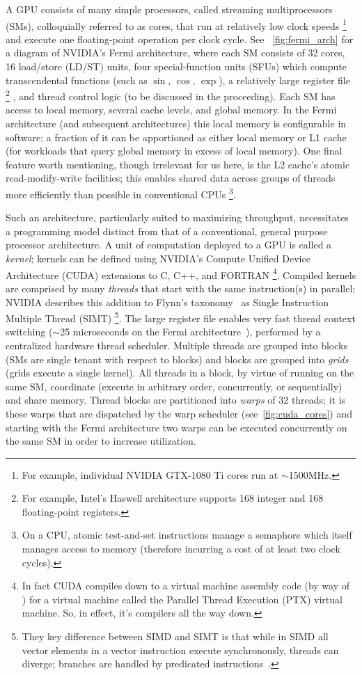 \documentclass[sigconf]{acmart}
\begin{document}
A GPU consists of many simple processors, called streaming multiprocessors (SMs), colloquially referred to as cores, that run at relatively low clock speeds%
\footnote{For example, individual NVIDIA GTX-1080 Ti cores run at $\sim$1500MHz.}
and execute one floating-point operation per clock cycle.
See ~\cref{fig:fermi_arch} for a diagram of NVIDIA's Fermi architecture, where each SM consists of 32 cores, 16 load/store (LD/ST) units, four special-function units (SFUs) which compute transcendental functions (such as $\sin$, $\cos$, $\exp$), a relatively large register file%
\footnote{For example, Intel's Haswell architecture supports 168 integer and 168 floating-point registers.}%
, and thread control logic (to be discussed in the proceeding).
Each SM has access to local memory, several cache levels, and global memory.
In the Fermi architecture (and subsequent architectures) this local memory is configurable in software;
a fraction of it can be apportioned as either local memory or L1 cache (for workloads that query global memory in excess of local memory).
One final feature worth mentioning, though irrelevant for us here, is the L2 cache's atomic read-modify-write facilities;
this enables shared data across groups of threads more efficiently than possible in conventional CPUs%
\footnote{On a CPU, atomic test-and-set instructions manage a semaphore which itself manages access to memory (therefore incurring a cost of at least two clock cycles).}.

Such an architecture, particularly suited to maximizing throughput, necessitates a programming model distinct from that of a conventional, general purpose processor architecture.
A unit of computation deployed to a GPU is called a \textit{kernel}; kernels can be defined using NVIDIA's Compute Unified Device Architecture (CUDA) extensions to C, C++, and FORTRAN%
\footnote{In fact CUDA compiles down to a virtual machine assembly code (by way of ) for a virtual machine called the Parallel Thread Execution (PTX) virtual machine. So, in effect, it's compilers all the way down.}.
Compiled kernels are comprised by many \textit{threads} that start with the same instruction(s) in parallel;
NVIDIA describes this addition to Flynn's taxonomy~\cite{5009071} as Single Instruction Multiple Thread (SIMT)%
\footnote{They key difference between SIMD and SIMT is that while in SIMD all vector elements in a vector instruction execute synchronously, threads can diverge; branches are handled by predicated instructions~\cite{cuda_toolkit}.}.
The large register file enables very fast thread context switching ($\sim$25 microseconds on the Fermi architecture~\cite{Glaskowsky2009NVIDIAS}), performed by a centralized hardware thread scheduler.
Multiple threads are grouped into blocks (SMs are single tenant with respect to blocks) and blocks are grouped into \textit{grids} (grids execute a single kernel).
All threads in a block, by virtue of running on the same SM, coordinate (execute in arbitrary order, concurrently, or sequentially) and share memory.
Thread blocks are partitioned into \textit{warps} of 32 threads;
it is these warps that are dispatched by the warp scheduler (see~\cref{fig:cuda_cores}) and starting with the Fermi architecture two warps can be executed concurrently on the same SM in order to increase utilization.
\end{document}
